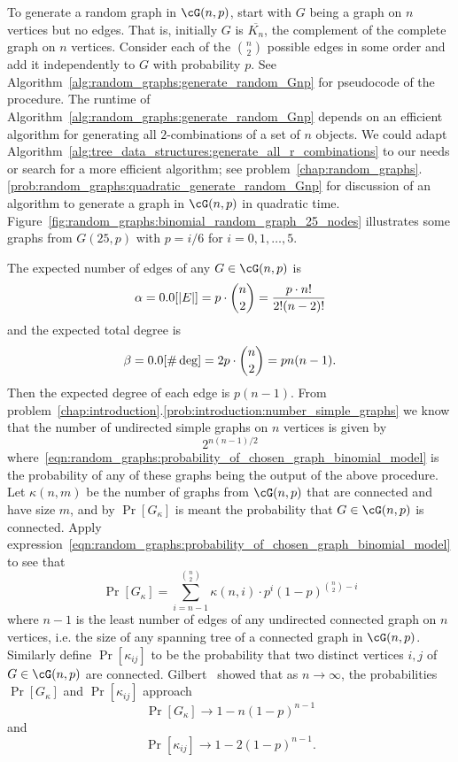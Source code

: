To generate a random graph in $\cG(n,p)$, start with $G$ being a graph
on $n$ vertices but no edges. That is, initially $G$ is
$\overline{K_n}$, the complement of the complete
graph on $n$ vertices. Consider each of the $\binom{n}{2}$ possible
edges in some order and add it independently to $G$ with probability
$p$. See Algorithm~\ref{alg:random_graphs:generate_random_Gnp} for
pseudocode of the procedure. The runtime of
Algorithm~\ref{alg:random_graphs:generate_random_Gnp} depends on an
efficient algorithm for generating all $2$-combinations of a set of
$n$ objects. We could adapt
Algorithm~\ref{alg:tree_data_structures:generate_all_r_combinations}
to our needs or search for a more efficient algorithm; see
problem~\ref{chap:random_graphs}.\ref{prob:random_graphs:quadratic_generate_random_Gnp}
for discussion of an algorithm to generate a graph in $\cG(n,p)$ in
quadratic
time. Figure~\ref{fig:random_graphs:binomial_random_graph_25_nodes}
illustrates some graphs from $G(25,p)$ with $p = i/6$ for
$i = 0, 1, \dots, 5$.

The expected number of edges of any $G \in \cG(n,p)$ is
\[
\alpha
=
\E[|E|]
=
p \cdot \binom{n}{2}
=
\frac{p \cdot n!} {2! (n - 2)!}
\]
and the expected total degree is
\[
\beta
=
\E[\#\deg]
=
2p \cdot \binom{n}{2}
=
pn(n - 1).
\]
Then the expected degree of each edge is $p(n - 1)$. From
problem~\ref{chap:introduction}.\ref{prob:introduction:number_simple_graphs}
we know that the number of undirected simple graphs on $n$ vertices is
given by
\[
2^{n(n-1) / 2}
\]
where~\eqref{eqn:random_graphs:probability_of_chosen_graph_binomial_model}
is the probability of any of these graphs being the output of the
above procedure. Let $\kappa(n,m)$ be the number of graphs from
$\cG(n,p)$ that are connected and have size $m$, and by $\Pr[G_\kappa]$
is meant the probability that $G \in \cG(n,p)$ is connected. Apply
expression~\eqref{eqn:random_graphs:probability_of_chosen_graph_binomial_model}
to see that
\[
\Pr[G_\kappa]
=
\sum_{i=n-1}^{\binom{n}{2}}
\kappa(n,i) \cdot p^i (1 - p)^{\binom{n}{2} - i}
\]
where $n - 1$ is the least number of edges of any undirected connected
graph on $n$ vertices, i.e. the size of any spanning tree of a
connected graph in $\cG(n,p)$. Similarly define $\Pr[\kappa_{ij}]$ to
be the probability that two distinct vertices $i,j$ of
$G \in \cG(n,p)$ are connected. Gilbert~\cite{Gilbert1959} showed that
as $n \to \infty$, the probabilities $\Pr[G_\kappa]$ and
$\Pr[\kappa_{ij}]$ approach
\[
\Pr[G_\kappa] \to 1 - n(1 - p)^{n-1}
\]
and
\[
\Pr[\kappa_{ij}] \to 1 - 2(1 - p)^{n-1}.
\]

